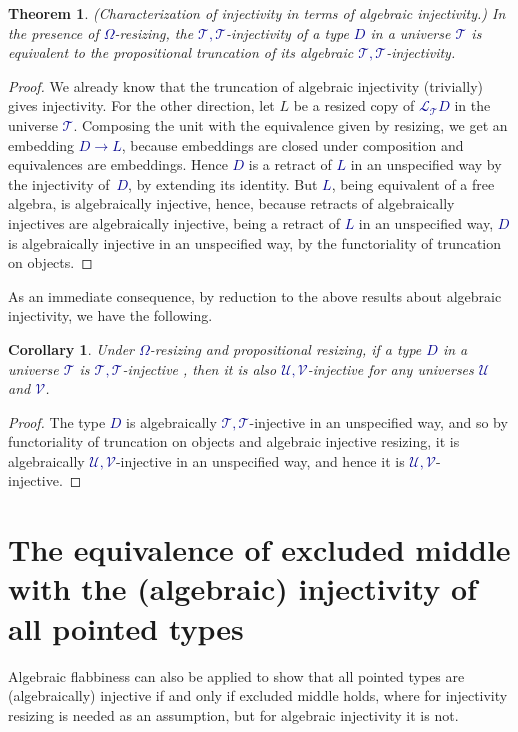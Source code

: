 \documentclass[10pt]{article}
\newcommand{\db}{\textcolor{darkblue}}
\newcommand{\m}[1]{\db{$#1$}}
\newcommand{\U}{\mathcal{U}}
\newcommand{\V}{\mathcal{V}}
\newcommand{\T}{\mathcal{T}}
\newcommand{\Lift}{\mathcal{L}}
\newtheorem{theorem}[numbered]{Theorem}
\newtheorem{corollary}[numbered]{Corollary}
\theoremstyle{definition}
\begin{document}
\begin{theorem} \label{better}
  (Characterization of injectivity in terms of algebraic injectivity.)
  In the presence of \m{\Omega}-resizing, the
  \m{\T,\T}-injectivity of a type \m{D} in a universe \m{\T} is
  equivalent to the propositional truncation of
  its algebraic \m{\T,\T}-injectivity.
\end{theorem}
\begin{proof}
  We already know that the truncation of algebraic injectivity
  (trivially) gives injectivity.  For the other direction, let $L$ be
  a resized copy of \m{\Lift_\T D} in the universe \m{\T}.  Composing
  the unit with the equivalence given by resizing, we get an embedding
  \m{D \to L}, because embeddings are closed under composition and
  equivalences are embeddings.  Hence \m{D} is a retract of \m{L} in
  an unspecified way by the injectivity of~\m{D}, by extending its
  identity.  But \m{L}, being equivalent of a free algebra, is
  algebraically injective, hence, because retracts of algebraically
  injectives are algebraically injective, being a retract of \m{L} in
  an unspecified way, \m{D} is algebraically injective in an
  unspecified way, by the functoriality of truncation on objects.
\end{proof}

As an immediate consequence, by reduction to the above results about algebraic
injectivity, we have the following.
\begin{corollary}
  Under \m{\Omega}-resizing and propositional resizing, if a type
  \m{D} in a universe \m{\T} is \m{\T,\T}-injective , then it is also
  \m{\U,\V}-injective for any universes \m{\U} and \m{\V}.
\end{corollary}
\begin{proof}
  The type \m{D} is algebraically \m{\T,\T}-injective in an
  unspecified way, and so by functoriality of truncation on objects
  and algebraic injective resizing, it is algebraically
  \m{\U,\V}-injective in an unspecified way, and hence it is
  \m{\U,\V}-injective.
\end{proof}

\section{The equivalence of  excluded middle with the (algebraic) injectivity of all pointed types}

Algebraic flabbiness can also be applied to show that all pointed
types are (algebraically) injective if and only if excluded middle
holds, where for injectivity resizing is needed as an assumption, but
for algebraic injectivity it is not.
\end{document}
